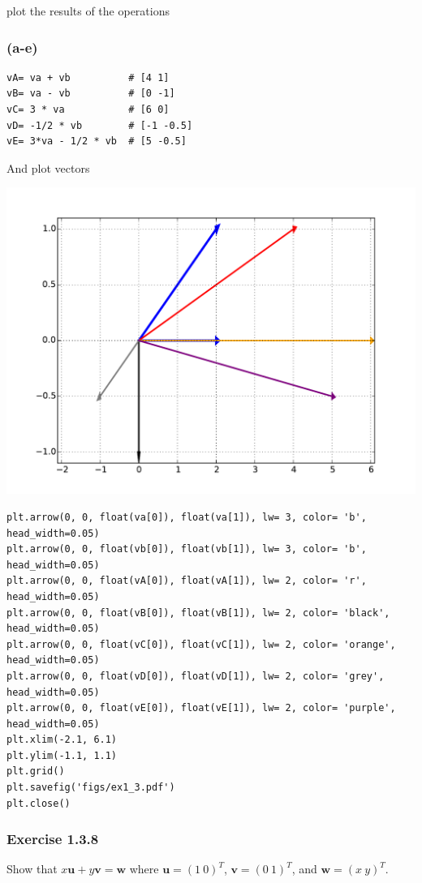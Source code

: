 \documentclass[a4paper]{article}
\begin{document}
plot the results of the operations 

\subsubsection{(a-e)}

\begin{verbatim}
vA= va + vb          # [4 1]
vB= va - vb          # [0 -1]
vC= 3 * va           # [6 0]
vD= -1/2 * vb        # [-1 -0.5]
vE= 3*va - 1/2 * vb  # [5 -0.5]
\end{verbatim}

And plot vectors

\includegraphics[width=\linewidth]{figs/ex1_3.pdf}

\begin{verbatim}
plt.arrow(0, 0, float(va[0]), float(va[1]), lw= 3, color= 'b', head_width=0.05)
plt.arrow(0, 0, float(vb[0]), float(vb[1]), lw= 3, color= 'b', head_width=0.05)
plt.arrow(0, 0, float(vA[0]), float(vA[1]), lw= 2, color= 'r', head_width=0.05)
plt.arrow(0, 0, float(vB[0]), float(vB[1]), lw= 2, color= 'black', head_width=0.05)
plt.arrow(0, 0, float(vC[0]), float(vC[1]), lw= 2, color= 'orange', head_width=0.05)
plt.arrow(0, 0, float(vD[0]), float(vD[1]), lw= 2, color= 'grey', head_width=0.05)
plt.arrow(0, 0, float(vE[0]), float(vE[1]), lw= 2, color= 'purple', head_width=0.05)
plt.xlim(-2.1, 6.1)
plt.ylim(-1.1, 1.1)
plt.grid()
plt.savefig('figs/ex1_3.pdf')
plt.close()
\end{verbatim}

\subsubsection{Exercise 1.3.8}
Show that $x\mathbf{u} + y\mathbf{v} = \mathbf{w}$ where
$\mathbf{u}= (1\ 0)^{T}$, $\mathbf{v}= (0\ 1)^{T}$, and $\mathbf{w}= (x\ y)^{T}$.
\end{document}
